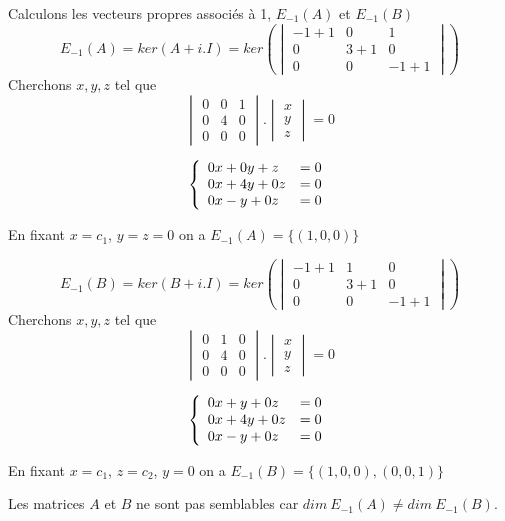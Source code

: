 \documentclass[]{book}
\theoremstyle{definition}
\begin{document}
Calculons les vecteurs propres associ\'es \`a 1, $E_{-1}(A)$ et $E_{-1}(B)$
$$E_{-1}(A)=ker(A+i.I) = ker\left( \begin{vmatrix} -1 + 1 & 0 & 1 \\ 0 & 3+1  & 0 \\  0 & 0 & -1 + 1 \end{vmatrix} \right)$$
Cherchons $x,y,z$ tel que
$$\begin{vmatrix} 0 & 0 & 1 \\ 0 & 4 & 0 \\  0 & 0 & 0 \end{vmatrix} . \begin{vmatrix} x \\ y \\  z \end{vmatrix} = 0$$

$$
\left\{ 
\begin{array}{l l}
0x  + 0y + z & = 0\\
0x  + 4y + 0z & = 0\\
0x - y + 0z & = 0\\
\end{array}
\right. 
$$ 

En fixant $x=c_1$, $y=z=0$ on a $E_{-1}(A) = \{(1,0,0)\}$ 

$$E_{-1}(B)=ker(B+i.I) = ker\left( \begin{vmatrix} -1 + 1 & 1 & 0 \\ 0 & 3+1  & 0 \\  0 & 0 & -1 + 1 \end{vmatrix} \right)$$
Cherchons $x,y,z$ tel que
$$\begin{vmatrix} 0 & 1 & 0 \\ 0 & 4 & 0 \\  0 & 0 & 0 \end{vmatrix} . \begin{vmatrix} x \\ y \\  z \end{vmatrix} = 0$$

$$
\left\{ 
\begin{array}{l l}
0x  + y + 0z & = 0\\
0x  + 4y + 0z & = 0\\
0x - y + 0z & = 0\\
\end{array}
\right. 
$$ 

En fixant $x=c_1$, $z=c_2$, $y=0$ on a $E_{-1}(B) = \{(1,0,0), (0,0,1)\}$ 

Les matrices $A$ et $B$ ne sont pas semblables car $dim\ E_{-1}(A) \neq dim\ E_{-1}(B)$.
\end{document}
